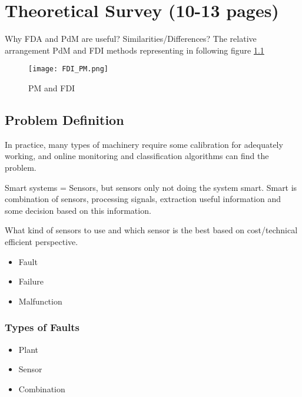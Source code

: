 
\chapter{Theoretical Survey (10-13 pages)}
Why FDA and PdM are useful? Similarities/Differences?
The relative arrangement PdM and FDI methods representing in following
figure \ref{fig:fdi_pm}
\begin{figure}[h!]
    \centering
    \texttt{[image: FDI\_PM.png]}
    \caption{PM and FDI }
    \label{fig:fdi_pm}
\end{figure}



% 

\section{Problem Definition}

In practice, many types of machinery require some calibration for adequately working,
and online monitoring and classification algorithms can find the problem.



Smart systems = Sensors, but sensors only not doing the system smart. Smart
is combination of sensors, processing signals, extraction useful information and
some decision based on this information.

What kind of sensors to use and which sensor is the best based on
cost/technical efficient perspective.

\begin{itemize}
    \item Fault
    \item Failure   
    \item Malfunction
\end{itemize}

\subsection{Types of Faults}
\begin{itemize}
    \item Plant
    \item Sensor
    \item Combination
\end{itemize}

